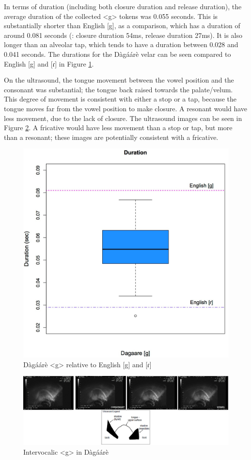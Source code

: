 \documentclass[output=paper, modfonts]{langscibook}
\begin{document}
In terms of duration (including both closure duration and release duration), the average duration of the collected <g> tokens was 0.055 seconds. This is substantially shorter than English [g], as a comparison, which has a duration of around 0.081 seconds (\citealt{byrd199354}: closure duration 54ms, release duration 27ms). It is also longer than an alveolar tap, which tends to have a duration between 0.028 and 0.041 seconds. The durations for the Dàgáárè velar can be seen compared to English [g] and [ɾ] in Figure \ref{tab:2:duration}. 


On the ultrasound, the tongue movement between the vowel position and the consonant was substantial; the tongue back raised towards the palate/velum. This degree of movement is consistent with either a stop or a tap, because the tongue moves far from the vowel position to make closure. A resonant would have less movement, due to the lack of closure. The ultrasound images can be seen in Figure \ref{tab:3:ultrasound}. A fricative would have less movement than a stop or tap, but more than a resonant; these images are  potentially consistent with a fricative. 

\begin{figure}[p]
\includegraphics[width=.8\linewidth]{g_duration.jpg}
\caption{Dàgáárè <g> relative to English [g] and [ɾ]}
\label{tab:2:duration}
\end{figure}

\begin{figure}[p]
\includegraphics[width=1\linewidth]{ultrasound.jpg}
\caption{Intervocalic <g> in Dàgáárè}
\label{tab:3:ultrasound}
\end{figure}
\end{document}
